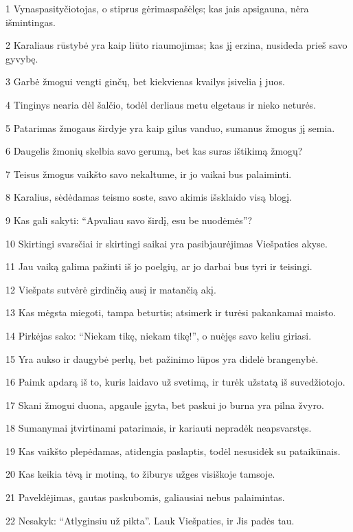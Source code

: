\par 1 Vynas­pasityčiotojas, o stiprus gėrimas­pašėlęs; kas jais apsigauna, nėra išmintingas. 
\par 2 Karaliaus rūstybė yra kaip liūto riaumojimas; kas jį erzina, nusideda prieš savo gyvybę. 
\par 3 Garbė žmogui vengti ginčų, bet kiekvienas kvailys įsivelia į juos. 
\par 4 Tinginys nearia dėl šalčio, todėl derliaus metu elgetaus ir nieko neturės. 
\par 5 Patarimas žmogaus širdyje yra kaip gilus vanduo, sumanus žmogus jį semia. 
\par 6 Daugelis žmonių skelbia savo gerumą, bet kas suras ištikimą žmogų? 
\par 7 Teisus žmogus vaikšto savo nekaltume, ir jo vaikai bus palaiminti. 
\par 8 Karalius, sėdėdamas teismo soste, savo akimis išsklaido visą blogį. 
\par 9 Kas gali sakyti: “Apvaliau savo širdį, esu be nuodėmės”? 
\par 10 Skirtingi svarsčiai ir skirtingi saikai yra pasibjaurėjimas Viešpaties akyse. 
\par 11 Jau vaiką galima pažinti iš jo poelgių, ar jo darbai bus tyri ir teisingi. 
\par 12 Viešpats sutvėrė girdinčią ausį ir matančią akį. 
\par 13 Kas mėgsta miegoti, tampa beturtis; atsimerk ir turėsi pakankamai maisto. 
\par 14 Pirkėjas sako: “Niekam tikę, niekam tikę!”, o nuėjęs savo keliu giriasi. 
\par 15 Yra aukso ir daugybė perlų, bet pažinimo lūpos yra didelė brangenybė. 
\par 16 Paimk apdarą iš to, kuris laidavo už svetimą, ir turėk užstatą iš suvedžiotojo. 
\par 17 Skani žmogui duona, apgaule įgyta, bet paskui jo burna yra pilna žvyro. 
\par 18 Sumanymai įtvirtinami patarimais, ir kariauti nepradėk neapsvarstęs. 
\par 19 Kas vaikšto plepėdamas, atidengia paslaptis, todėl nesusidėk su pataikūnais. 
\par 20 Kas keikia tėvą ir motiną, to žiburys užges visiškoje tamsoje. 
\par 21 Paveldėjimas, gautas paskubomis, galiausiai nebus palaimintas. 
\par 22 Nesakyk: “Atlyginsiu už pikta”. Lauk Viešpaties, ir Jis padės tau. 
